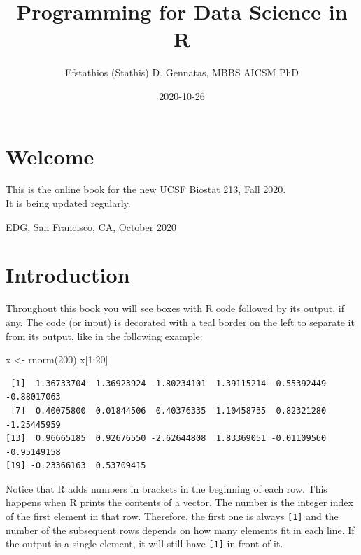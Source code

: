 \documentclass[
]{book}
\title{Programming for Data Science in R}
\author{Efstathios (Stathis) D. Gennatas, MBBS AICSM PhD}
\date{2020-10-26}
\newenvironment{Shaded}{\begin{snugshade}}{\end{snugshade}}
\newcommand{\DecValTok}[1]{\textcolor[rgb]{0.00,0.00,0.81}{#1}}
\newcommand{\FunctionTok}[1]{\textcolor[rgb]{0.00,0.00,0.00}{#1}}
\newcommand{\NormalTok}[1]{#1}
\newcommand{\OtherTok}[1]{\textcolor[rgb]{0.56,0.35,0.01}{#1}}
\newcommand{\SpecialCharTok}[1]{\textcolor[rgb]{0.00,0.00,0.00}{#1}}
\begin{document}
\maketitle

{
\setcounter{tocdepth}{1}
\tableofcontents
}
\hypertarget{welcome}{%
\chapter*{Welcome}\label{welcome}}

This is the online book for the new UCSF Biostat 213, Fall 2020.\\
It is being updated regularly.

EDG, San Francisco, CA, October 2020

\hypertarget{introduction}{%
\chapter{Introduction}\label{introduction}}

Throughout this book you will see boxes with R code followed by its output, if any. The code (or input) is decorated with a teal border on the left to separate it from its output, like in the following example:

\begin{Shaded}
\begin{Highlighting}[]
\NormalTok{x }\OtherTok{\textless{}{-}} \FunctionTok{rnorm}\NormalTok{(}\DecValTok{200}\NormalTok{)}
\NormalTok{x[}\DecValTok{1}\SpecialCharTok{:}\DecValTok{20}\NormalTok{]}
\end{Highlighting}
\end{Shaded}

\begin{verbatim}
 [1]  1.36733704  1.36923924 -1.80234101  1.39115214 -0.55392449 -0.88017063
 [7]  0.40075800  0.01844506  0.40376335  1.10458735  0.82321280 -1.25445959
[13]  0.96665185  0.92676550 -2.62644808  1.83369051 -0.01109560 -0.95149158
[19] -0.23366163  0.53709415
\end{verbatim}

Notice that R adds numbers in brackets in the beginning of each row. This happens when R prints the contents of a vector. The number is the integer index of the first element in that row. Therefore, the first one is always \texttt{{[}1{]}} and the number of the subsequent rows depends on how many elements fit in each line. If the output is a single element, it will still have \texttt{{[}1{]}} in front of it.
\end{document}
